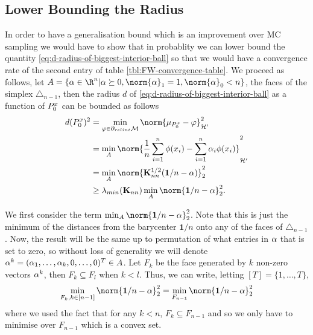 \subsection{Lower Bounding the Radius}
In order to have a generalisation bound which is an improvement over MC sampling
we would have to show that in probablity we can lower bound the quantity
\ref{eq:d-radius-of-biggest-interior-ball} so that we would have a convergence
rate of the second entry of table \ref{tbl:FW-convergence-table}. We proceed as
follows, let \(A = \{\mat{\alpha} \in \R^n | \mat{\alpha} \succeq 0, \norm{\mat{\alpha}}_1 = 1,
\norm{\mat{\alpha}}_0 < n\}\), the faces of the simplex
\(\triangle_{n-1}\), then the radius \(d\) of
\ref{eq:d-radius-of-biggest-interior-ball} as a function of \(P^x_{0}\)
can be bounded as follows
\begin{align*}
  d(\poolsetx_0)^2 & = \min_{\varphi \in \partial_{relint} \mathcal{M}}\norm{\mu_{\poolsetx_0} - \varphi}^2_{\rkhs{H}'} \\
                   & = \min_{A}\norm{\frac{1}{n}\sum_{i=1}^n\phi(x_i) - \sum_{i=1}^n \alpha_{i} \phi(x_{i})}^2_{\rkhs{H}'} \\
                   & = \min_{A} \norm{\mat{K}_{nn}^{1/2}(\mathbf{1}/n - \mat{\alpha})}_{2}^2 \\
                   & \geq \lambda_{min}(\mat{K}_{nn}) \min_{A} \norm{\mathbf{1}/n - \mat{\alpha}}_{2}^2.
\end{align*}

We first consider the term \(\min_{A} \norm{\mathbf{1}/n -
\mat{\alpha}}_{2}^2\). Note that this is just the minimum of the distances from
the barycenter \(\mathbf{1}/n\) onto any of the faces of \(\triangle_{n-1}\).
Now, the result will be the same up to permutation
of what entries in \(\mathbf{\alpha}\) that is set to zero, so without loss of
generality we will denote \(\mathbf{\alpha}^{k} = (\alpha_{1}, \dots, \alpha_{k},
0, \dots, 0)^{T} \in A\). Let \(F_{k}\) be the face generated by \(k\)
non-zero vectors \(\mathbf{\alpha}^{k}\), then \(F_{k} \subseteq F_{l}\) when \(k
< l\). Thus, we can write, letting \([T] = \{1, \dots, T\}\),
\begin{equation}
  \label{eq:d-optim-problem}
  \min_{F_{k}, k \in [n-1]} \norm{\mathbf{1}/n - \mat{\alpha}}_{2}^2 = \min_{F_{n-1}}\norm{\mathbf{1}/n - \mat{\alpha}}_{2}^2
\end{equation}
where we used the fact that for any \(k < n\), \(F_{k} \subseteq F_{n-1}\) and
so we only have to minimise over \(F_{n-1}\) which is a convex set.

